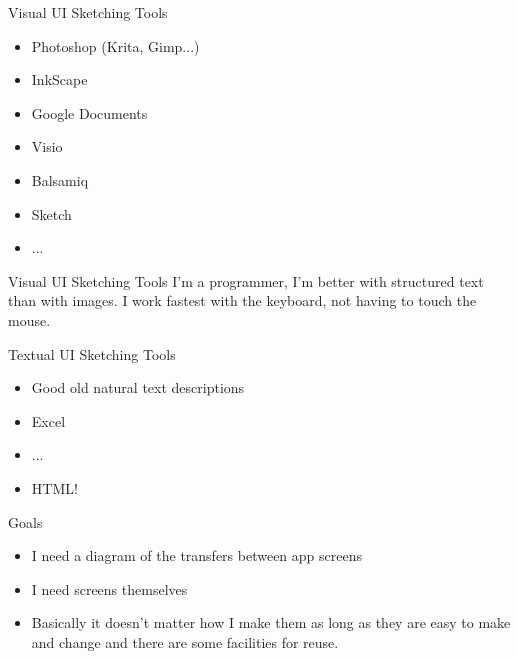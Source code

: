 \documentclass[aspectratio=43,handout,bigger]{beamer}
\begin{document}
\begin{frame}{Visual UI Sketching Tools}
  \begin{itemize}
    \item Photoshop (Krita, Gimp...)
    \item InkScape
    \item Google Documents
    \item Visio
    \item Balsamiq
    \item Sketch
    \item ...
  \end{itemize}
\end{frame}


\begin{frame}{Visual UI Sketching Tools}
  I'm a programmer, I'm better with structured text than with images.
  \newline
  \newline
  I work fastest with the keyboard, not having to touch the mouse.
\end{frame}


\begin{frame}{Textual UI Sketching Tools}
  \begin{itemize}
    \item Good old natural text descriptions
    \item Excel
    \item ...
    \item HTML!
  \end{itemize}
\end{frame}


\begin{frame}{Goals}
  \begin{itemize}
    \item I need a diagram of the transfers between app screens
    \item I need screens themselves
    \item Basically it doesn't matter how I make them as long
          as they are easy to make and change and there are some
          facilities for reuse.
  \end{itemize}
\end{frame}
\end{document}
